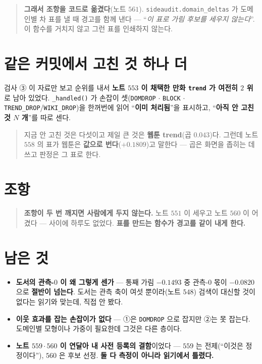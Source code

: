 \documentclass[11pt]{article}
\begin{document}
\begin{quote}
\textbf{그래서 조항을 코드로 옮겼다}(노트 $561$).
\texttt{sideaudit.domain\_deltas} 가 도메인별 차 표를 낼 때 경고를 함께
낸다 --- ``\emph{이 표로 가림 후보를 세우지 않는다}''. 이 함수를 거치지 않고
그런 표를 인쇄하지 않는다.
\end{quote}

\section*{같은 커밋에서 고친 것 하나 더}

검사 ③ 이 자료만 보고 순위를 내서 \textbf{노트 $553$ 이 채택한 만화
\texttt{trend} 가 여전히 $2$ 위}로 남아 있었다. \texttt{\_handled()} 가
손잡이 셋(\texttt{DOMDROP} $\cdot$ \texttt{BLOCK} $\cdot$
\texttt{TREND\_DROP}/\texttt{WIKI\_DROP})을 한꺼번에 읽어 ``\textbf{이미
처리됨}''을 표시하고, ``\textbf{아직 안 고친 것 $N$ 개}''를 따로 센다.

\begin{quote}
지금 안 고친 것은 다섯이고 제일 큰 것은 \textbf{웹툰 trend}(곱 $0.043$)다.
그런데 노트 $558$ 의 표가 웹툰은 \textbf{값으로 번다}($+0.1809$)고 말한다 ---
곱은 화면을 좁히는 데 쓰고 판정은 그 표로 한다.
\end{quote}

\section*{조항}

\begin{quote}
\textbf{조항이 두 번 깨지면 사람에게 두지 않는다.} 노트 $551$ 이 세우고
노트 $560$ 이 어겼다 --- 사이에 하루도 없었다. \textbf{표를 만드는 함수가
경고를 같이 내게 한다.}
\end{quote}

\section*{남은 것}

\begin{itemize}
\item \textbf{도서의 관측-$0$ 이 왜 그렇게 센가} --- 통째 가림 $-0.1493$ 중
관측-$0$ 몫이 $-0.0820$ 으로 \textbf{절반이 넘는다}. 도서는 관측 축이 여섯
뿐이라(노트 $548$) 검색이 대신할 것이 없다는 읽기와 맞는데, 직접 안 봤다.
\item \textbf{이웃 효과를 잡는 손잡이가 없다} --- ①은 \texttt{DOMDROP} 으로
잡지만 ②는 못 잡는다. 도메인별 모형이나 가중이 필요한데 그것은 다른 층이다.
\item \textbf{노트 $559 \cdot 560$ 이 연달아 내 사전 등록의 결함}이었다 ---
$559$ 는 전제(``이것은 정정이다''), $560$ 은 후보 선정. \textbf{둘 다 측정이
아니라 읽기에서 틀렸다.}
\end{itemize}
\end{document}
